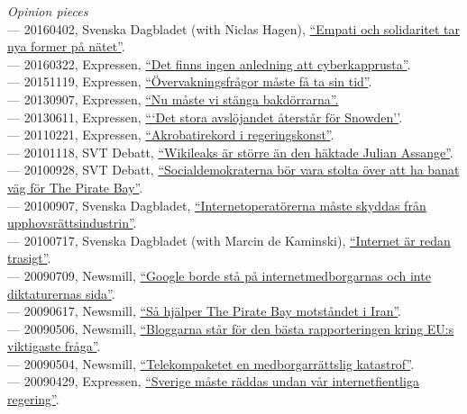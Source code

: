 \documentclass[a4paper,11pt,oneside]{article}
\begin{document}
  \noindent \emph{Opinion pieces} \\
  --- 20160402, Svenska Dagbladet (with Niclas Hagen), \href{http://www.svd.se/empati-och-solidaritet-tar-nya-former-pa-natet}{``Empati och solidaritet tar nya former på nätet''}. \\
  --- 20160322, Expressen, \href{http://www.expressen.se/debatt/finns-ingen-anledning-att-cyberkapprusta/}{``Det finns ingen anledning att cyberkapprusta''}. \\
  --- 20151119, Expressen, \href{http://www.expressen.se/debatt/overvakningsfragor-maste-fa-ta-sin-tid/}{``Övervakningsfrågor måste få ta sin tid''}. \\
  --- 20130907, Expressen, \href{http://www.expressen.se/debatt/nu-maste-vi-stanga-bakdorrarna/}{``Nu måste vi stänga bakdörrarna''.} \\
  --- 20130611, Expressen, \href{http://www.expressen.se/debatt/det-stora-avslojandet-aterstar-for-snowden/}{```Det stora avslöjandet återstår för Snowden''}. \\
  --- 20110221, Expressen, \href{http://www.expressen.se/debatt/christopher-kullenberg-akrobatikrekord-i-regeringskonst/}{``Akrobatirekord i regeringskonst''}. \\
  --- 20101118, SVT Debatt, \href{}{``Wikileaks är större än den häktade Julian Assange''}. \\
  --- 20100928, SVT Debatt, \href{}{``Socialdemokraterna bör vara stolta över att ha banat väg för The Pirate Bay''}. \\
  --- 20100907, Svenska Dagbladet, \href{http://www.svd.se/internetoperatorerna-maste-skyddas-fran-upphovsrattsindustrin}{``Internetoperatörerna måste skyddas från upphovsrättsindustrin''}. \\
  --- 20100717, Svenska Dagbladet (with Marcin de Kaminski), \href{http://www.svd.se/internet-ar-redan-trasigt}{``Internet är redan trasigt''}. \\
  --- 20090709, Newsmill, \href{}{``Google borde stå på internetmedborgarnas och inte diktaturernas sida''}. \\
  --- 20090617, Newsmill, \href{}{``Så hjälper The Pirate Bay motståndet i Iran''}. \\
  --- 20090506, Newsmill, \href{}{``Bloggarna står för den bästa rapporteringen kring EU:s viktigaste fråga''}. \\
  --- 20090504, Newsmill, \href{}{``Telekompaketet en medborgarrättslig katastrof''}. \\
  --- 20090429, Expressen, \href{http://www.expressen.se/debatt/sverige-maste-raddas-undan-var-internetfientliga-regering/}{``Sverige måste räddas undan vår internetfientliga regering''}. \\
\end{document}
